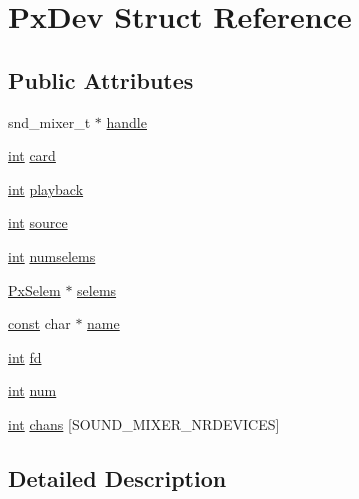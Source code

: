 \hypertarget{struct_px_dev}{}\section{Px\+Dev Struct Reference}
\label{struct_px_dev}
\subsection*{Public Attributes}
\begin{DoxyCompactItemize}
\item 
snd\+\_\+mixer\+\_\+t $\ast$ \hyperlink{struct_px_dev_a33e59c1f53433e686aab9aa2ffa905ce}{handle}
\item 
\hyperlink{xmltok_8h_a5a0d4a5641ce434f1d23533f2b2e6653}{int} \hyperlink{struct_px_dev_a137b489e777aee4166eaf6187194f679}{card}
\item 
\hyperlink{xmltok_8h_a5a0d4a5641ce434f1d23533f2b2e6653}{int} \hyperlink{struct_px_dev_af610bb780669676f95d76c4bc73eb931}{playback}
\item 
\hyperlink{xmltok_8h_a5a0d4a5641ce434f1d23533f2b2e6653}{int} \hyperlink{struct_px_dev_ac68ecd5ff76aaacc51b8f221b881523e}{source}
\item 
\hyperlink{xmltok_8h_a5a0d4a5641ce434f1d23533f2b2e6653}{int} \hyperlink{struct_px_dev_a6ef87a02c48b56cb5d244d460d8efcb9}{numselems}
\item 
\hyperlink{struct_px_selem}{Px\+Selem} $\ast$ \hyperlink{struct_px_dev_ab3d66a4034ed70766ef65563870e2c09}{selems}
\item 
\hyperlink{getopt1_8c_a2c212835823e3c54a8ab6d95c652660e}{const} char $\ast$ \hyperlink{struct_px_dev_a273a11f4c6f5391a10c2eff6065b3ad9}{name}
\item 
\hyperlink{xmltok_8h_a5a0d4a5641ce434f1d23533f2b2e6653}{int} \hyperlink{struct_px_dev_a132f899f97616da06340264b9e2f3947}{fd}
\item 
\hyperlink{xmltok_8h_a5a0d4a5641ce434f1d23533f2b2e6653}{int} \hyperlink{struct_px_dev_a2de180f172743685d701800a359ec710}{num}
\item 
\hyperlink{xmltok_8h_a5a0d4a5641ce434f1d23533f2b2e6653}{int} \hyperlink{struct_px_dev_a257da37c1b421eec16020585d9291e3b}{chans} \mbox{[}S\+O\+U\+N\+D\+\_\+\+M\+I\+X\+E\+R\+\_\+\+N\+R\+D\+E\+V\+I\+C\+ES\mbox{]}
\end{DoxyCompactItemize}


\subsection{Detailed Description}



